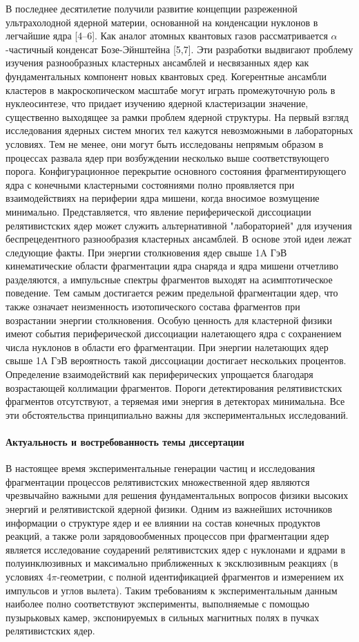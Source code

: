 \documentclass[fontsize=14pt]{scrarticle}
\begin{document}
В последнее десятилетие получили развитие концепции разреженной ультрахолодной ядерной материи, основанной на конденсации нуклонов в легчайшие ядра [4–6]. Как аналог атомных квантовых газов рассматривается $\alpha$-частичный конденсат Бозе-Эйнштейна [5,7]. Эти разработки выдвигают проблему изучения разнообразных кластерных ансамблей и несвязанных ядер как фундаментальных компонент новых квантовых сред. Когерентные ансамбли кластеров в макроскопическом масштабе могут играть промежуточную роль в нуклеосинтезе, что придает изучению ядерной кластеризации значение, существенно выходящее за рамки проблем ядерной структуры. На первый взгляд исследования ядерных систем многих тел кажутся невозможными в лабораторных условиях. Тем не менее, они могут быть исследованы непрямым образом в процессах развала ядер при возбуждении несколько выше соответствующего порога. Конфигурационное перекрытие основного состояния фрагментирующего ядра с конечными кластерными состояниями полно проявляется при взаимодействиях на периферии ядра мишени, когда вносимое возмущение минимально. Представляется, что явление периферической диссоциации релятивистских ядер может служить альтернативной "лабораторией" для изучения беспрецедентного разнообразия кластерных ансамблей. В основе этой идеи лежат следующие факты. При энергии столкновения ядер свыше 1A ГэВ кинематические области фрагментации ядра снаряда и ядра мишени отчетливо разделяются, а импульсные спектры фрагментов выходят на асимптотическое поведение. Тем самым достигается режим предельной фрагментации ядер, что также означает неизменность изотопического состава фрагментов при возрастании энергии столкновения. Особую ценность для кластерной физики имеют события периферической диссоциации налетающего ядра с сохранением числа нуклонов в области его фрагментации. При энергии налетающих ядер свыше 1A ГэВ вероятность такой диссоциации достигает нескольких процентов. Определение взаимодействий как периферических упрощается благодаря возрастающей коллимации фрагментов. Пороги детектирования релятивистских фрагментов отсутствуют, а теряемая ими энергия в детекторах минимальна. Все эти обстоятельства принципиально важны для экспериментальных исследований.
\paragraph{Актуальность и востребованность темы диссертации} В настоящее время экспериментальные генерации частиц и исследования
фрагментации процессов релятивистских множественной ядер являются
чрезвычайно важными для решения фундаментальных вопросов физики
высоких энергий и релятивистской ядерной физики. Одним из важнейших
источников информации о структуре ядер и ее влиянии на состав конечных продуктов реакций, а также роли зарядовообменных процессов при фрагментации ядер является исследование соударений релятивистских ядер с нуклонами и ядрами в полуинклюзивных и максимально приближенных к эксклюзивным реакциях (в условиях 4$\pi$-геометрии,
с полной идентификацией фрагментов и измерением их импульсов и углов вылета). Таким требованиям к экспериментальным данным наиболее полно соответствуют эксперименты, выполняемые с помощью пузырьковых камер, экспонируемых в сильных магнитных полях в пучках релятивистских ядер.
\end{document}
